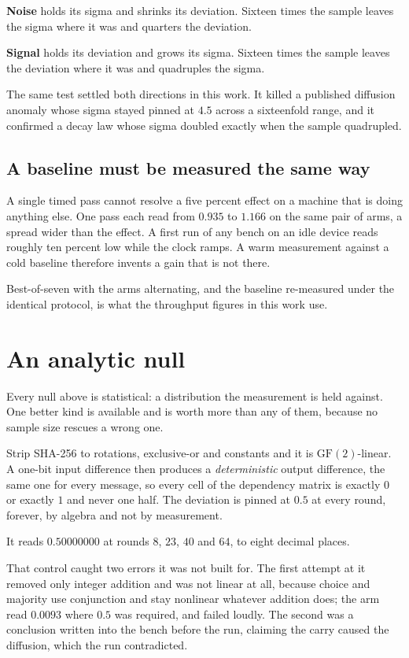 \textbf{Noise} holds its sigma and shrinks its deviation. Sixteen times the sample leaves the sigma where it was and quarters the deviation.

\textbf{Signal} holds its deviation and grows its sigma. Sixteen times the sample leaves the deviation where it was and quadruples the sigma.

The same test settled both directions in this work. It killed a published diffusion anomaly whose sigma stayed pinned at \(4.5\) across a sixteenfold range, and it confirmed a decay law whose sigma doubled exactly when the sample quadrupled.

\subsection{A baseline must be measured the same way}

A single timed pass cannot resolve a five percent effect on a machine that is doing anything else. One pass each read from \(0.935\) to \(1.166\) on the same pair of arms, a spread wider than the effect. A first run of any bench on an idle device reads roughly ten percent low while the clock ramps. A warm measurement against a cold baseline therefore invents a gain that is not there.

Best-of-seven with the arms alternating, and the baseline re-measured under the identical protocol, is what the throughput figures in this work use.

\section{An analytic null}

Every null above is statistical: a distribution the measurement is held against. One better kind is available and is worth more than any of them, because no sample size rescues a wrong one.

Strip SHA-256 to rotations, exclusive-or and constants and it is \(\mathrm{GF}(2)\)-linear. A one-bit input difference then produces a \emph{deterministic} output difference, the same one for every message, so every cell of the dependency matrix is exactly \(0\) or exactly \(1\) and never one half. The deviation is pinned at \(0.5\) at every round, forever, by algebra and not by measurement.

It reads \(0.50000000\) at rounds \(8\), \(23\), \(40\) and \(64\), to eight decimal places.

That control caught two errors it was not built for. The first attempt at it removed only integer addition and was not linear at all, because choice and majority use conjunction and stay nonlinear whatever addition does; the arm read \(0.0093\) where \(0.5\) was required, and failed loudly. The second was a conclusion written into the bench before the run, claiming the carry caused the diffusion, which the run contradicted.

